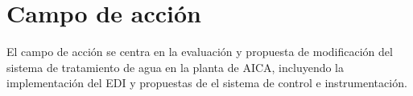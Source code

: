 \section*{Campo de acción}
El campo de acción se centra en la evaluación y propuesta de 
modificación del sistema de tratamiento de agua en la planta de 
AICA, incluyendo la implementación del EDI y propuestas 
de el sistema de control e instrumentación.\\